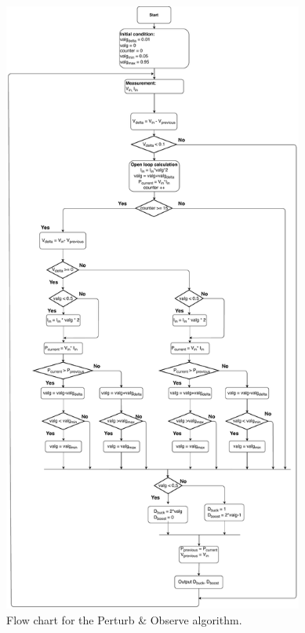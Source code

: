 \begin{figure}[H]
	\begin{center}
		\includegraphics[width=0.88\textwidth]{../Pictures/P1/Flow_chart/2018_11_29_Flow_chart_MPPT_Buck_Bosst_converter.pdf}
		\caption{Flow chart for the Perturb \& Observe algorithm.}
		\label{fcfinal} 
	\end{center}	
\end{figure}

